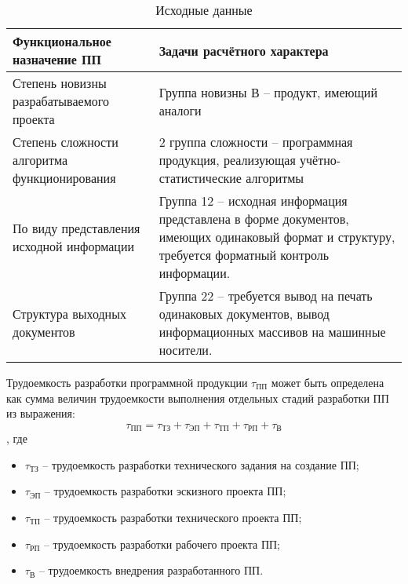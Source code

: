 \documentclass[a4paper,12pt]{article}\usepackage[]{graphicx}\usepackage[]{color}
\numberwithin{equation}{section}
\begin{document}
\begin{table}
  \begin{tabu} {|X[-1]|X|} \hline
    Функциональное назначение ПП & Задачи расчётного характера \\\hline
    Степень новизны разрабатываемого проекта & Группа новизны В -- продукт, имеющий аналоги \\\hline
    Степень сложности алгоритма функционирования & 2 группа сложности --
    программная продукция, реализующая учётно-статистические алгоритмы \\\hline
    По виду представления исходной информации & Группа 12 -- исходная информация
    представлена в форме документов, имеющих одинаковый формат и структуру,
    требуется форматный контроль информации. \\\hline
    Структура выходных документов & Группа 22 -- требуется вывод на печать одинаковых
    документов, вывод информационных массивов на машинные носители. \\\hline
  \end{tabu}
  \label{tab:source}
  \caption{Исходные данные}
\end{table}

Трудоемкость  разработки  программной  продукции $\tau_{ПП}$ может  быть 
определена  как  сумма  величин  трудоемкости  выполнения отдельных стадий 
разработки ПП из выражения:
\begin{equation} \label{eq:diff}
  \tau_{ПП} = \tau_{ТЗ} + \tau_{ЭП} + \tau_{ТП} + \tau_{РП} + \tau_{В}
\end{equation}
, где
\begin{itemize}
\item $\tau_{ТЗ}$ -- трудоемкость разработки технического задания на создание ПП; 
\item $\tau_{ЭП}$ -- трудоемкость разработки эскизного проекта ПП; 
\item $\tau_{ТП}$ -- трудоемкость разработки технического проекта ПП; 
\item $\tau_{РП}$ -- трудоемкость разработки рабочего проекта ПП; 
\item $\tau_{В}$ -- трудоемкость внедрения разработанного ПП. 
\end{itemize}
  
\end{document}
